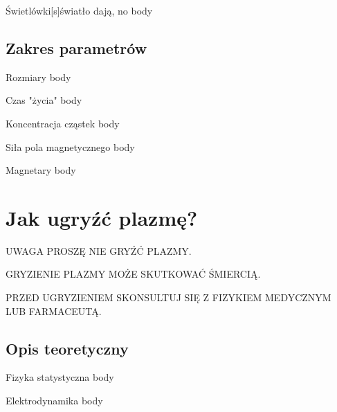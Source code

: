\documentclass{beamer}
\begin{document}
\begin{frame}[t]{Świetlówki}[s]{światło dają, no}
  body
\end{frame}

\subsection{Zakres parametrów}
\begin{frame}[t]{Rozmiary}
  body
\end{frame}

\begin{frame}[t]{Czas "życia"}
  body
\end{frame}

\begin{frame}[t]{Koncentracja cząstek}
  body
\end{frame}

\begin{frame}[t]{Siła pola magnetycznego}
  body
\end{frame}

\begin{frame}[t]{Magnetary}
  body
\end{frame}

\section{Jak ugryźć plazmę?}
\begin{frame}[t]{UWAGA}
  PROSZĘ NIE GRYŹĆ PLAZMY.

  GRYZIENIE PLAZMY MOŻE SKUTKOWAĆ ŚMIERCIĄ.

  PRZED UGRYZIENIEM SKONSULTUJ SIĘ Z FIZYKIEM MEDYCZNYM LUB FARMACEUTĄ.
\end{frame}
\subsection{Opis teoretyczny}

\begin{frame}[t]{Fizyka statystyczna}
  body
\end{frame}


\begin{frame}[t]{Elektrodynamika}
  body
\end{frame}
\end{document}
